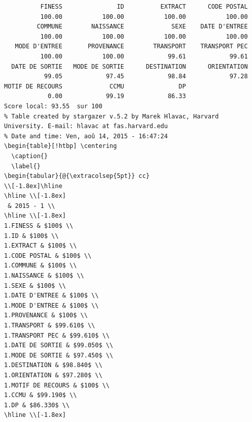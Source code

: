 \documentclass[]{article}
\begin{document}
\begin{verbatim}
          FINESS               ID          EXTRACT      CODE POSTAL 
          100.00           100.00           100.00           100.00 
         COMMUNE        NAISSANCE             SEXE    DATE D'ENTREE 
          100.00           100.00           100.00           100.00 
   MODE D'ENTREE       PROVENANCE        TRANSPORT    TRANSPORT PEC 
          100.00           100.00            99.61            99.61 
  DATE DE SORTIE   MODE DE SORTIE      DESTINATION      ORIENTATION 
           99.05            97.45            98.84            97.28 
MOTIF DE RECOURS             CCMU               DP 
            0.00            99.19            86.33 
Score local: 93.55  sur 100
% Table created by stargazer v.5.2 by Marek Hlavac, Harvard University. E-mail: hlavac at fas.harvard.edu
% Date and time: Ven, aoû 14, 2015 - 16:47:24
\begin{table}[!htbp] \centering 
  \caption{} 
  \label{} 
\begin{tabular}{@{\extracolsep{5pt}} cc} 
\\[-1.8ex]\hline 
\hline \\[-1.8ex] 
 & 2015 - 1 \\ 
\hline \\[-1.8ex] 
1.FINESS & $100$ \\ 
1.ID & $100$ \\ 
1.EXTRACT & $100$ \\ 
1.CODE POSTAL & $100$ \\ 
1.COMMUNE & $100$ \\ 
1.NAISSANCE & $100$ \\ 
1.SEXE & $100$ \\ 
1.DATE D'ENTREE & $100$ \\ 
1.MODE D'ENTREE & $100$ \\ 
1.PROVENANCE & $100$ \\ 
1.TRANSPORT & $99.610$ \\ 
1.TRANSPORT PEC & $99.610$ \\ 
1.DATE DE SORTIE & $99.050$ \\ 
1.MODE DE SORTIE & $97.450$ \\ 
1.DESTINATION & $98.840$ \\ 
1.ORIENTATION & $97.280$ \\ 
1.MOTIF DE RECOURS & $100$ \\ 
1.CCMU & $99.190$ \\ 
1.DP & $86.330$ \\ 
\hline \\[-1.8ex] 

\end{verbatim}
\end{document}
